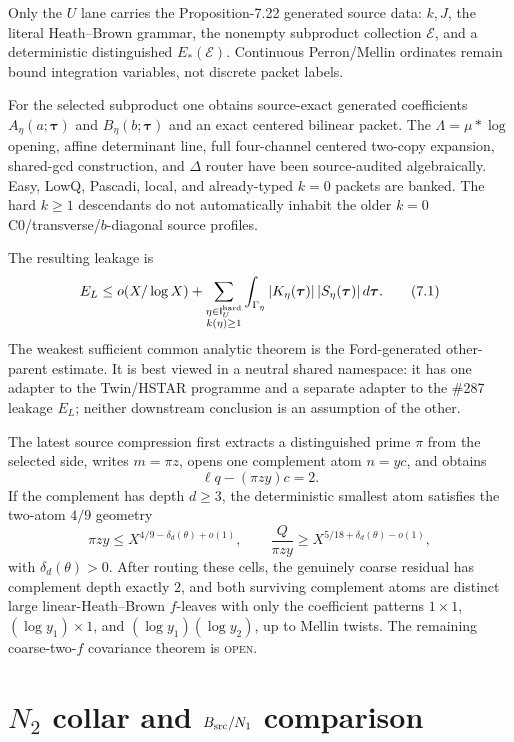\documentclass[11pt]{article}
\theoremstyle{definition}
\newcommand{\1}{\mathbf 1}
\newcommand{\openstatus}{\textsc{open}}
\begin{document}
Only the $U$ lane carries the Proposition-7.22 generated source data: $k,J$, the literal Heath--Brown grammar, the nonempty subproduct collection $\mathcal E$, and a deterministic distinguished $E_*(\mathcal E)$. Continuous Perron/Mellin ordinates remain bound integration variables, not discrete packet labels.

For the selected subproduct one obtains source-exact generated coefficients $A_\eta(a;\boldsymbol\tau)$ and $B_\eta(b;\boldsymbol\tau)$ and an exact centered bilinear packet. The $\Lambda=\mu*\log$ opening, affine determinant line, full four-channel centered two-copy expansion, shared-gcd construction, and $\Delta$ router have been source-audited algebraically. Easy, LowQ, Pascadi, local, and already-typed $k=0$ packets are banked. The hard $k\ge1$ descendants do not automatically inhabit the older $k=0$ C0/transverse/$b$-diagonal source profiles.

The resulting leakage is
\[
E_L\le o(X/\log X)+
\sum_{\substack{\eta\in\mathsf I_U^{\rm hard}\\k(\eta)\ge1}}
\int_{\Gamma_\eta}|K_\eta(\boldsymbol\tau)|\,|S_\eta(\boldsymbol\tau)|\,d\boldsymbol\tau.
\tag{7.1}
\]
The weakest sufficient common analytic theorem is the Ford-generated other-parent estimate. It is best viewed in a neutral shared namespace: it has one adapter to the Twin/HSTAR programme and a separate adapter to the \#287 leakage $E_L$; neither downstream conclusion is an assumption of the other.

The latest source compression first extracts a distinguished prime $\pi$ from the selected side, writes $m=\pi z$, opens one complement atom $n=yc$, and obtains
\[
\ell q-(\pi zy)c=2.
\tag{7.2}
\]
If the complement has depth $d\ge3$, the deterministic smallest atom satisfies the two-atom $4/9$ geometry
\[
\pi zy\le X^{4/9-\delta_d(\theta)+o(1)},\qquad
\frac{Q}{\pi zy}\ge X^{5/18+\delta_d(\theta)-o(1)},
\]
with $\delta_d(\theta)>0$. After routing these cells, the genuinely coarse residual has complement depth exactly $2$, and both surviving complement atoms are distinct large linear-Heath--Brown $f$-leaves with only the coefficient patterns $1\times1$, $(\log y_1)\times1$, and $(\log y_1)(\log y_2)$, up to Mellin twists. The remaining coarse-two-$f$ covariance theorem is \openstatus.

\section{$N_2$ collar and $B_{\rm src}/N_1$ comparison}
\end{document}
